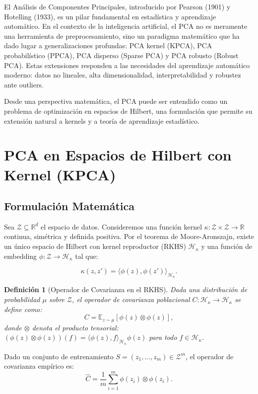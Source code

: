 \documentclass[11pt]{article}
\theoremstyle{plain}
\newtheorem{definition}[theorem]{Definición}
\begin{document}
El Análisis de Componentes Principales, introducido por Pearson (1901) y Hotelling (1933), es un pilar fundamental en estadística y aprendizaje automático. En el contexto de la inteligencia artificial, el PCA no es meramente una herramienta de preprocesamiento, sino un paradigma matemático que ha dado lugar a generalizaciones profundas: PCA kernel (KPCA), PCA probabilístico (PPCA), PCA disperso (Sparse PCA) y PCA robusto (Robust PCA). Estas extensiones responden a las necesidades del aprendizaje automático moderno: datos no lineales, alta dimensionalidad, interpretabilidad y robustez ante outliers.

Desde una perspectiva matemática, el PCA puede ser entendido como un problema de optimización en espacios de Hilbert, una formulación que permite su extensión natural a kernels y a teoría de aprendizaje estadístico.

\section{PCA en Espacios de Hilbert con Kernel (KPCA)}

\subsection{Formulación Matemática}

Sea $\mathcal{Z} \subseteq \mathbb{R}^d$ el espacio de datos. Consideremos una función kernel $\kappa: \mathcal{Z} \times \mathcal{Z} \to \mathbb{R}$ continua, simétrica y definida positiva. Por el teorema de Moore-Aronszajn, existe un único espacio de Hilbert con kernel reproductor (RKHS) $\mathcal{H}_\kappa$ y una función de embedding $\phi: \mathcal{Z} \to \mathcal{H}_\kappa$ tal que:

\[
\kappa(z, z') = \langle \phi(z), \phi(z') \rangle_{\mathcal{H}_\kappa}.
\]

\begin{definition}[Operador de Covarianza en el RKHS]
Dada una distribución de probabilidad $\mu$ sobre $\mathcal{Z}$, el operador de covarianza poblacional $C: \mathcal{H}_\kappa \to \mathcal{H}_\kappa$ se define como:
\[
C = \mathbb{E}_{z \sim \mu}[\phi(z) \otimes \phi(z)],
\]
donde $\otimes$ denota el producto tensorial: $(\phi(z) \otimes \phi(z))(f) = \langle \phi(z), f \rangle_{\mathcal{H}_\kappa} \phi(z)$ para todo $f \in \mathcal{H}_\kappa$.
\end{definition}

Dado un conjunto de entrenamiento $S = (z_1, \ldots, z_m) \in \mathcal{Z}^m$, el operador de covarianza empírico es:
\[
\hat{C} = \frac{1}{m} \sum_{i=1}^m \phi(z_i) \otimes \phi(z_i).
\]
\end{document}
